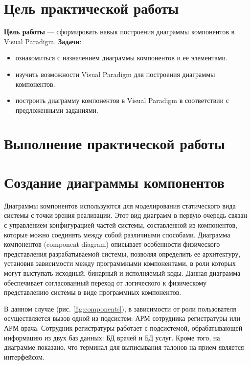 \graphicspath{{./sisxth/img/}} %

\section*{\LARGE Цель практической работы}

\textbf{Цель работы} --- сформировать навык построения диаграммы компонентов
в Visual Paradigm.
\textbf{Задачи}:
\begin{itemize}
	\item ознакомиться с назначением диаграммы компонентов и ее элементами.
	\item изучить возможности Visual Paradigm для построения диаграммы
		компонентов.
	\item построить диаграмму компонентов в Visual Paradigm в соответствии с
		предложенными заданиями.
\end{itemize}


\clearpage

\section*{\LARGE Выполнение практической работы}
\section{Создание диаграммы компонентов}
Диаграммы компонентов используются для моделирования статического
вида системы с точки зрения реализации. Этот вид диаграмм в первую очередь
связан с управлением конфигурацией частей системы, составленной из
компонентов, которые можно соединять между собой различными способами.
Диаграмма компонентов (component diagram) описывает особенности
физического представления разрабатываемой системы, позволяя определить ее
архитектуру, установив зависимости между программными компонентами, в
роли которых могут выступать исходный, бинарный и исполняемый коды.
Данная диаграмма обеспечивает согласованный переход от логического к
физическому представлению системы в виде программных компонентов.\par
В данном случае (рис. \ref{fig:components}), в зависимости от роли
пользователя осуществляется вызов одной из подсистем: АРМ сотрудника
регистратуры или АРМ врача. Сотрудник регистратуры работает с подсистемой,
обрабатывающей информацию из двух баз данных: БД врачей и БД услуг.
Кроме того, на диаграмме показано, что терминал для выписывания талонов
на прием является интерфейсом.

